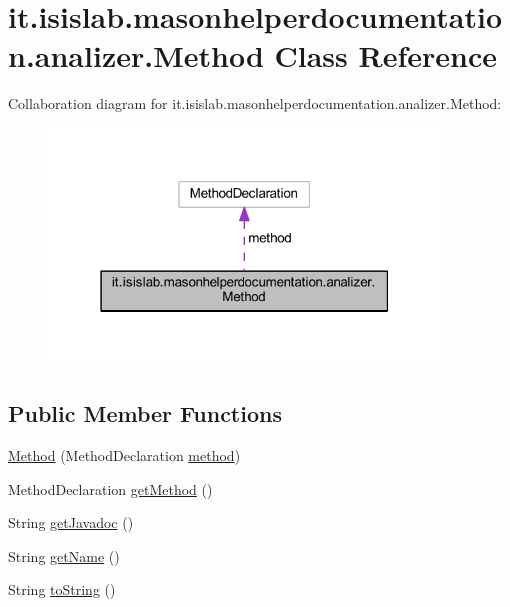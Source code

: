 \hypertarget{classit_1_1isislab_1_1masonhelperdocumentation_1_1analizer_1_1_method}{\section{it.\-isislab.\-masonhelperdocumentation.\-analizer.\-Method Class Reference}
\label{classit_1_1isislab_1_1masonhelperdocumentation_1_1analizer_1_1_method}
}


Collaboration diagram for it.\-isislab.\-masonhelperdocumentation.\-analizer.\-Method\-:\nopagebreak
\begin{figure}[H]
\begin{center}
\leavevmode
\includegraphics[width=295pt]{classit_1_1isislab_1_1masonhelperdocumentation_1_1analizer_1_1_method__coll__graph}
\end{center}
\end{figure}
\subsection*{Public Member Functions}
\begin{DoxyCompactItemize}
\item 
\hyperlink{classit_1_1isislab_1_1masonhelperdocumentation_1_1analizer_1_1_method_ad78f0e595b288424c9ce252fdb70a72d}{Method} (Method\-Declaration \hyperlink{classit_1_1isislab_1_1masonhelperdocumentation_1_1analizer_1_1_method_a86b6aa02f4993d83ee78e19f1f211130}{method})
\item 
Method\-Declaration \hyperlink{classit_1_1isislab_1_1masonhelperdocumentation_1_1analizer_1_1_method_a5bfd1c50aae2fe3d33e58132b0439796}{get\-Method} ()
\item 
String \hyperlink{classit_1_1isislab_1_1masonhelperdocumentation_1_1analizer_1_1_method_a4289b699595931edc00f2d80ae8e8af3}{get\-Javadoc} ()
\item 
String \hyperlink{classit_1_1isislab_1_1masonhelperdocumentation_1_1analizer_1_1_method_ab867c9f3e8a3b0aa9f960d3fe3a1db04}{get\-Name} ()
\item 
String \hyperlink{classit_1_1isislab_1_1masonhelperdocumentation_1_1analizer_1_1_method_abd783b39c400e8db1f5e0f08c00c8e5a}{to\-String} ()
\end{DoxyCompactItemize}
